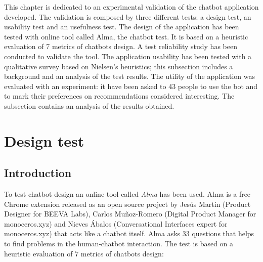 \documentclass[b5paper,10pt,twoside,cucitura]{toptesi}
\begin{document}
This chapter is dedicated to an experimental validation of the chatbot application developed. The validation is composed by three different tests: a design test, an usability test and an usefulness test. The design of the application has been tested with online tool called Alma, the chatbot test. It is based on a heuristic evaluation of 7 metrics of chatbots design. A test reliability study has been conducted to validate the tool. The application usability has been tested with a qualitative survey based on Nielsen's heuristics; this subsection includes a background and an analysis of the test results. The utility of the application was evaluated with an experiment: it have been asked to 43 people to use the bot and to mark their preferences on recommendations considered interesting. The subsection contains an analysis of the results obtained. 


\section{Design test}

\subsection{Introduction}

To test chatbot design an online tool called \textit{Alma}   \citep{chatbottest} has been used. Alma is a free Chrome extension released as an open source project by Jesús Martín (Product Designer for BEEVA Labs), Carlos Muñoz-Romero (Digital Product Manager for monoceros.xyz) and Nieves Ábalos (Conversational Interfaces expert for monoceros.xyz) that acts like a chatbot itself. Alma asks 33 questions that helps to find problems in the human-chatbot interaction. The test is based on a heuristic evaluation of 7 metrics of chatbots design:
\end{document}
